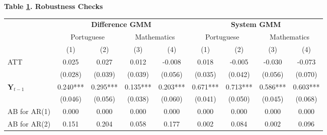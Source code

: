 \documentclass[a4paper, 12pt]{article}
\begin{document}
{
\begin{table}[h]                                    \label{table:Robustness}                        \centering            \textbf{Table \ref{table:Robustness}. Robustness Checks} \\             
\vspace{5pt}
\begin{adjustbox}{max width=\textwidth}           
\begin{tabular}{@{\extracolsep{4pt}}l*{8}{c}@{}}             \toprule             & \multicolumn{4}{c}{\textbf{Difference GMM}} &            \multicolumn{4}{c}{\textbf{System GMM}}  \\            \cline{2-5}              \cline{6-9}                   & \multicolumn{2}{c}{Portuguese} &                    \multicolumn{2}{c}{Mathematics} &                    \multicolumn{2}{c}{Portuguese} &            \multicolumn{2}{c}{Mathematics}  \\            \cline{2-3}                    \cline{4-5}                    \cline{6-7}            \cline{8-9}        
                    &         (1)   &         (2)   &         (3)   &         (4)   &         (1)   &         (2)   &         (3)   &         (4)   \\
\hline
ATT                 &    0.025     &   0.027      &   0.012     &       -0.008 &   0.018     &    -0.005     &   -0.030      &  -0.073       \\
                    &  (0.028)      &   (0.039)     &   (0.039)     &    (0.056)    & (0.035)   &   (0.042)    &   (0.056)     &      (0.070) \\
$\mathbf{Y}_{t-1}$              &  0.240***    &  0.295***     &              0.135*** &       0.203***        &  0.671***     & 0.713***      &              0.586*** &     0.603***       \\
                    &  (0.046)      &   (0.056)     &    (0.038)        & (0.060)  &   (0.041)     &   (0.050)     &    (0.045)         &            (0.068) \\
\hline 
AB for AR(1)  &        0.000       &      0.000         &              0.000 & 0.000    &             0.000 &        0.000       &             0.000 &             0.000           \\
AB for AR(2) &      0.151         &    0.204         &              0.058 & 0.177   &  0.002   &   0.084           &       0.002        &       0.096        \\

\end{tabular}
\end{adjustbox}
\end{table}}
\end{document}
